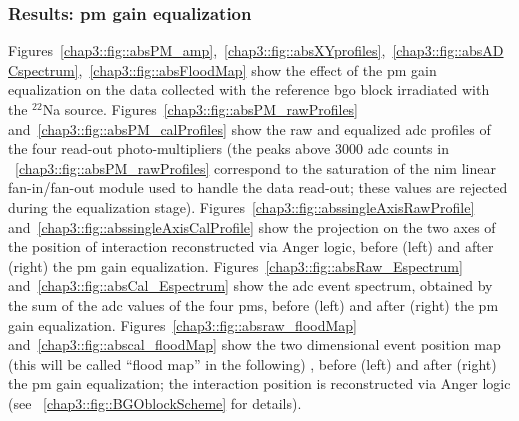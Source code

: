 \subsubsection{Results: \gls{pm} gain equalization}\label{chap3::subsubsec::absPMgainCal}
Figures~\ref{chap3::fig::absPM_amp},~\ref{chap3::fig::absXYprofiles},~\ref{chap3::fig::absADCspectrum},~\ref{chap3::fig::absFloodMap} show the effect of the \gls{pm} gain equalization on the data collected with the reference \gls{bgo} block irradiated with the $^{22}$Na source.
Figures~\ref{chap3::fig::absPM_rawProfiles} and~\ref{chap3::fig::absPM_calProfiles} show the raw and equalized \gls{adc} profiles of the four read-out photo-multipliers (the peaks above 3000 \gls{adc} counts in \figurename~\ref{chap3::fig::absPM_rawProfiles} correspond to the saturation of the \gls{nim} linear fan-in/fan-out module used to handle the data read-out; these values are rejected during the equalization stage).
Figures~\ref{chap3::fig::abssingleAxisRawProfile} and~\ref{chap3::fig::abssingleAxisCalProfile} show the projection on the two axes of the position of interaction reconstructed via Anger logic, before (left) and after (right) the \gls{pm} gain equalization.
Figures~\ref{chap3::fig::absRaw_Espectrum} and~\ref{chap3::fig::absCal_Espectrum} show the \gls{adc} event spectrum, obtained by the sum of the \gls{adc} values of the four \glspl{pm}, before (left) and after (right) the \gls{pm} gain equalization.
Figures~\ref{chap3::fig::absraw_floodMap} and~\ref{chap3::fig::abscal_floodMap} show the two dimensional event position map (this will be called \enquote{flood map} in the following) , before (left) and after (right) the \gls{pm} gain equalization; the interaction position is reconstructed via Anger logic (see \figurename~\ref{chap3::fig::BGOblockScheme} for details).

